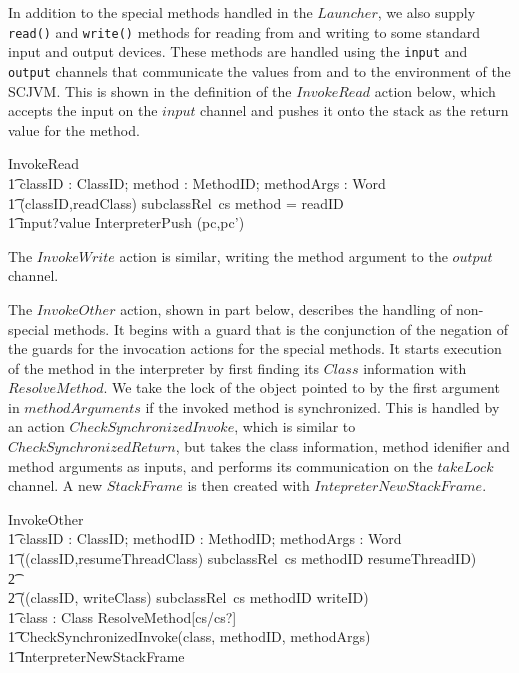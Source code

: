 In addition to the special methods handled in the $Launcher$, we also
supply \texttt{read()} and \texttt{write()} methods for reading from
and writing to some standard input and output devices. 
These methods are handled using the \texttt{input} and \texttt{output}
channels that communicate the values from and to the environment of
the SCJVM.
This is shown in the definition of the $InvokeRead$ action below,
which accepts the input on the $input$ channel and pushes it onto the
stack as the return value for the method.
\begin{circusaction}
  InvokeRead \circdef \\
  \t1 \circval classID : ClassID; \circval method : MethodID; \circval methodArgs : \seq Word \circspot \\
  \t1 \lcircguard (classID,readClass) \in subclassRel~cs \land method = readID \rcircguard \circguard {} \\
  \t1 input?value \then \lschexpract InterpreterPush \hide (pc,pc') \rschexpract
\end{circusaction}
The $InvokeWrite$ action is similar, writing the method argument to
the $output$ channel.

The $InvokeOther$ action, shown in part below, describes the handling
of non-special methods.
It begins with a guard that is the conjunction of the negation of the
guards for the invocation actions for the special methods.
It starts execution of the method in the interpreter by first finding
its $Class$ information with $ResolveMethod$.
We take the lock of the object pointed to by the first argument in
$methodArguments$ if the invoked method is synchronized.
This is handled by an action $CheckSynchronizedInvoke$, which is
similar to $CheckSynchronizedReturn$, but takes the class information,
method idenifier and method arguments as inputs, and performs its
communication on the $takeLock$ channel. 
A new $StackFrame$ is then created with $IntepreterNewStackFrame$.
\begin{circusaction}
  InvokeOther \circdef \\
  \t1 \circval classID : ClassID; \circval methodID : MethodID; \circval methodArgs : \seq Word \circspot \\
  \t1 \lcircguard ((classID,resumeThreadClass) \notin subclassRel~cs \lor methodID \neq resumeThreadID) \\
  \t2 {} \land \cdots \\
  \t2 {} \land ((classID, writeClass) \notin subclassRel~cs \lor methodID \neq writeID) \rcircguard \circguard {} \\
  \t1 \circvar class : Class \circspot \lschexpract ResolveMethod[cs/cs?] \rschexpract \circseq \\
  \t1 CheckSynchronizedInvoke(class, methodID, methodArgs) \circseq \\
  \t1 \lschexpract InterpreterNewStackFrame \rschexpract
\end{circusaction}

